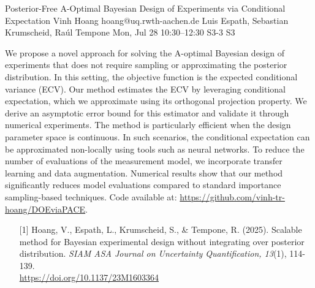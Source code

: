 \begin{talk}
  {Posterior-Free A-Optimal Bayesian Design of Experiments via Conditional Expectation}%
  {Vinh Hoang}%
  {hoang@uq.rwth-aachen.de}%
  {Luis Espath, Sebastian Krumscheid, Ra\'ul Tempone}%
  {}%
  {}%
  {Mon, Jul 28 10:30–12:30}%
  {S3-3}%
  {S3}%
  
				
			

\medskip

We propose a novel approach for solving the A-optimal Bayesian design of experiments that does not require sampling or approximating the posterior distribution. In this setting, the objective function is the expected conditional variance (ECV).
Our method estimates the ECV by leveraging conditional expectation, which we approximate using its orthogonal projection property. We derive an asymptotic error bound for this estimator and validate it through numerical experiments.
The method is particularly efficient when the design parameter space is continuous. In such scenarios, the conditional expectation can be approximated non-locally using tools such as neural networks. To reduce the number of evaluations of the measurement model, we incorporate transfer learning and data augmentation.
Numerical results show that our method significantly reduces model evaluations compared to standard importance sampling-based techniques.
Code available at: \href{https://github.com/vinh-tr-hoang/DOEviaPACE}{https://github.com/vinh-tr-hoang/DOEviaPACE}.

\begin{enumerate}
    \item [{[1]}] Hoang, V., Espath, L., Krumscheid, S., \& Tempone, R. (2025).  
    Scalable method for Bayesian experimental design without integrating over posterior distribution. {\it SIAM ASA Journal on Uncertainty Quantification, 13}(1), 114-139. \\
    \href{https://doi.org/10.1137/23M1603364}{https://doi.org/10.1137/23M1603364}
\end{enumerate}


\end{talk}

